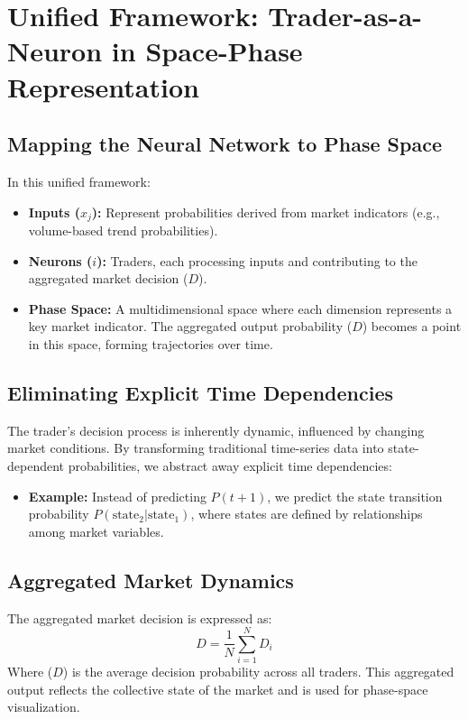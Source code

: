 \documentclass[a4]{article}
\begin{document}
\section{Unified Framework: Trader-as-a-Neuron in Space-Phase Representation}

\subsection{Mapping the Neural Network to Phase Space}

In this unified framework:

\begin{itemize}
\item  {\bf Inputs ($x_j$):} Represent probabilities derived from market indicators (e.g., volume-based trend probabilities).  
\item {\bf Neurons ($i$):} Traders, each processing inputs and contributing to the aggregated market decision ($D$).  
\item {\bf Phase Space:} A multidimensional space where each dimension represents a key market indicator. The aggregated output probability ($D$) becomes a point in this space, forming trajectories over time.
\end{itemize}

\subsection{Eliminating Explicit Time Dependencies}

The trader's decision process is inherently dynamic, influenced by changing market conditions. By transforming traditional time-series data into state-dependent probabilities, we abstract away explicit time dependencies:

\begin{itemize}
\item  {\bf Example:} Instead of predicting $P(t+1)$, we predict the state transition probability $P(\text{state}_2 | \text{state}_1)$, where states are defined by relationships among market variables.
\end{itemize}


\subsection{Aggregated Market Dynamics}

The aggregated market decision is expressed as:
$$
D = \frac{1}{N} \sum_{i=1}^N D_i
$$
Where ($D$) is the average decision probability across all traders. This aggregated output reflects the collective state of the market and is used for phase-space visualization.
\end{document}
